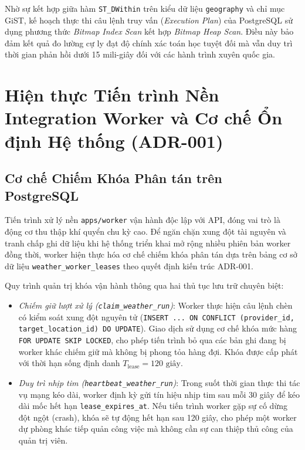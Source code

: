 Nhờ sự kết hợp giữa hàm \texttt{ST\_DWithin} trên kiểu dữ liệu \texttt{geography} và chỉ mục GiST, kế hoạch thực thi câu lệnh truy vấn (\textit{Execution Plan}) của PostgreSQL sử dụng phương thức \textit{Bitmap Index Scan} kết hợp \textit{Bitmap Heap Scan}. Điều này bảo đảm kết quả đo lường cự ly đạt độ chính xác toán học tuyệt đối mà vẫn duy trì thời gian phản hồi dưới 15 mili-giây đối với các hành trình xuyên quốc gia.

\section{Hiện thực Tiến trình Nền Integration Worker và Cơ chế Ổn định Hệ thống (ADR-001)}
\label{sec:worker_resilience_impl}

\subsection{Cơ chế Chiếm Khóa Phân tán trên PostgreSQL}
Tiến trình xử lý nền \texttt{apps/worker} vận hành độc lập với API, đóng vai trò là động cơ thu thập khí quyển chu kỳ cao. Để ngăn chặn xung đột tài nguyên và tranh chấp ghi dữ liệu khi hệ thống triển khai mở rộng nhiều phiên bản worker đồng thời, worker hiện thực hóa cơ chế chiếm khóa phân tán dựa trên bảng cơ sở dữ liệu \texttt{weather\_worker\_leases} theo quyết định kiến trúc ADR-001.

Quy trình quản trị khóa vận hành thông qua hai thủ tục lưu trữ chuyên biệt:
\begin{itemize}
    \item[-] \textit{Chiếm giữ lượt xử lý (\texttt{claim\_weather\_run})}: Worker thực hiện câu lệnh chèn có kiểm soát xung đột nguyên tử (\texttt{INSERT ... ON CONFLICT (provider\_id, target\_location\_id) DO UPDATE}). Giao dịch sử dụng cơ chế khóa mức hàng \texttt{FOR UPDATE SKIP LOCKED}, cho phép tiến trình bỏ qua các bản ghi đang bị worker khác chiếm giữ mà không bị phong tỏa hàng đợi. Khóa được cấp phát với thời hạn sống định danh $T_{\text{lease}} = 120\text{ giây}$.
    \item[-] \textit{Duy trì nhịp tim (\texttt{heartbeat\_weather\_run})}: Trong suốt thời gian thực thi tác vụ mạng kéo dài, worker định kỳ gửi tín hiệu nhịp tim sau mỗi 30 giây để kéo dài mốc hết hạn \texttt{lease\_expires\_at}. Nếu tiến trình worker gặp sự cố dừng đột ngột (crash), khóa sẽ tự động hết hạn sau 120 giây, cho phép một worker dự phòng khác tiếp quản công việc mà không cần sự can thiệp thủ công của quản trị viên.
\end{itemize}

